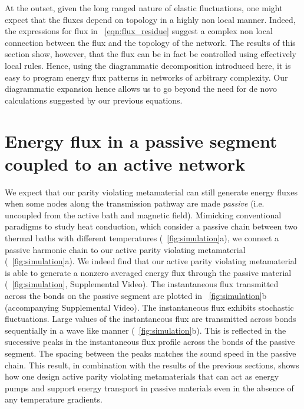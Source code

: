 \documentclass[
 preprint,
 preprintnumbers,
 amsmath,amssymb,
 aps,
 pre,
 longbibliography,
 superscriptaddress,
 10pt, twocolumn
]{revtex4-1}
\begin{document}
At the outset, given the long ranged nature of elastic fluctuations, one might expect that the fluxes depend on topology in a highly non local manner. Indeed, the expressions for flux in \eqnname~\ref{eqn:flux_residue} suggest a complex non local connection between the flux and the topology of the network. The results of this section show, however, that the flux can be in fact be controlled using effectively local rules. Hence, using the diagrammatic decomposition introduced here, it is easy to program energy flux patterns in networks of arbitrary complexity. Our diagrammatic expansion hence allows us to go beyond the need for de novo calculations suggested by our previous equations.

\section{Energy flux in a passive segment coupled to an active network} \label{sec:passive}
\label{sec:passiveflux}
We expect that our parity violating metamaterial can still generate energy fluxes when some nodes along the transmission pathway are made {\it passive} (i.e. uncoupled from the active bath and magnetic field).
Mimicking conventional paradigms to study heat conduction, which consider a passive chain between two thermal baths with different temperatures (\figurename~\ref{fig:simulation}a), we connect a passive harmonic chain to our active parity violating metamaterial (\figurename~\ref{fig:simulation}a).
We indeed find that our active parity violating metamaterial is able to generate a nonzero averaged energy flux through the passive material (\figurename~\ref{fig:simulation}, Supplemental Video). The instantaneous flux transmitted across the bonds on the passive segment are plotted in \figurename~\ref{fig:simulation}b (accompanying Supplemental Video). The instantaneous flux exhibits stochastic fluctuations. Large values of the instantaneous flux are transmitted across bonds sequentially in a wave like manner (\figurename~\ref{fig:simulation}b). This is reflected in the successive peaks in the instantaneous flux profile across the bonds of the passive segment.  The spacing between the peaks matches the sound speed in the passive chain. This result, in combination with the results of the previous sections, shows how one design active parity violating metamaterials that can act as energy pumps and support energy transport in passive materials even in the absence of any temperature gradients. 
\end{document}
